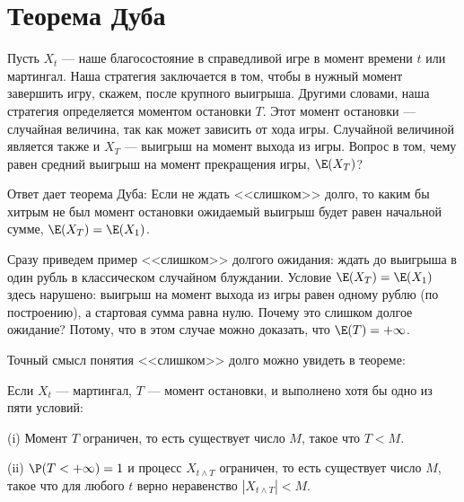 





\section{Теорема Дуба}


Пусть $X_{t}$ --- наше благосостояние в справедливой игре в момент времени $t$ или мартингал. Наша стратегия заключается в том, чтобы в нужный момент завершить игру, скажем, после крупного выигрыша. Другими словами, наша стратегия определяется моментом остановки $T$. Этот момент остановки --- случайная величина, так как может зависить от хода игры. Случайной величиной является также и $X_{T}$ --- выигрыш на момент выхода из игры. Вопрос в том, чему равен средний выигрыш на момент прекращения игры, $\E(X_{T})$?

Ответ дает теорема Дуба:
Если не ждать <<слишком>> долго, то каким бы хитрым не был момент остановки ожидаемый выигрыш будет равен начальной сумме, $\E(X_{T})=\E(X_{1})$. 

Сразу приведем пример <<слишком>> долгого ожидания: ждать до выигрыша в один рубль в классическом случайном блуждании. Условие  $\E(X_{T})=\E(X_{1})$ здесь нарушено: выигрыш на момент выхода из игры равен одному рублю (по построению), а стартовая сумма равна нулю. Почему это слишком долгое ожидание? Потому, что в этом случае можно доказать, что $\E(T)=+\infty$. 

Точный смысл понятия <<слишком>> долго можно увидеть в теореме: 

Если $X_{t}$ --- мартингал, $T$ --- момент остановки, и выполнено хотя бы одно из пяти условий: 

(i) Момент $T$ ограничен, то есть существует число $M$, такое что $T<M$. 

(ii) $\P(T<+\infty)=1$ и процесс $X_{t\wedge T}$ ограничен, то есть существует число $M$, такое что для любого $t$ верно неравенство $|X_{t\wedge T}|<M$. 

